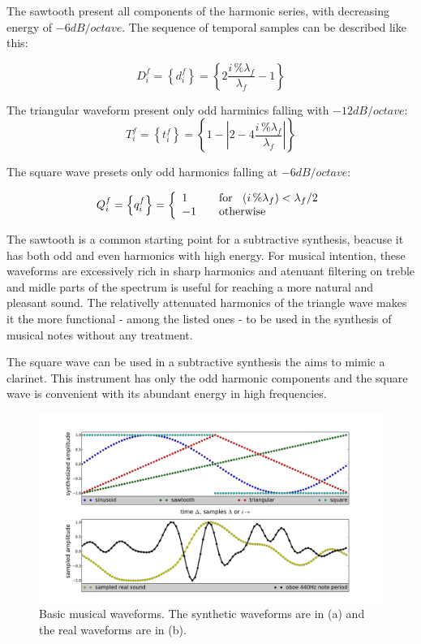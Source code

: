 \documentclass[
 aip,
 jmp,
 amsmath,amssymb,
 reprint,
]{revtex4-1}
\begin{document}
The sawtooth present all components of the harmonic series, with decreasing energy of $-6dB/octave$. The sequence of temporal samples can be described like this:

\begin{equation}\label{sawTooth}
     D^f_i=\left\{ d^f_i \right\}=\left\{ 2\frac{i\,\%\lambda_f}{\lambda_f} -1 \right\}
\end{equation}

The triangular waveform present only odd harminics falling with $-12dB/octave$:
\begin{equation}\label{triangular}
     T^f_i=\left\{ t^f_i \right\}=\left\{1- \left| 2 - 4\frac{i\,\%\lambda_f}{\lambda_f} \right| \right\}
\end{equation}

The square wave presets only odd harmonics falling at $-6dB/octave$:

\begin{equation}\label{quadrada}
     Q^f_i=\left\{ q^f_i \right\}= \left\{
         \begin{array}{l l}
              1 & \quad \text{for } \; \; (i\,\%\lambda_f)   <  \lambda_f /2  \\
              -1 & \quad \text{otherwise}\\
         \end{array} \right.
\end{equation}

The sawtooth is a common starting point for a subtractive synthesis, beacuse it has both odd and even harmonics with high energy. For musical intention, these waveforms are excessively rich in sharp harmonics and atenuant filtering on treble and midle parts of the spectrum is useful for reaching a more natural and pleasant sound. 
The relativelly attenuated harmonics of the triangle wave makes it the more functional - among the listed ones - to be used in the synthesis of musical notes without any treatment.

The square wave can be used in a subtractive synthesis the aims to mimic a clarinet. This instrument has only the odd harmonic components and the square wave is convenient with its abundant energy in high frequencies.

\begin{figure}
    \centering
        \includegraphics[width=\textwidth]{figures/waveForms}
    \caption{Basic musical waveforms. The synthetic  waveforms are in (a) and the real waveforms are in (b).}
        \label{fig:formasDeOnda}
\end{figure}
\end{document}
